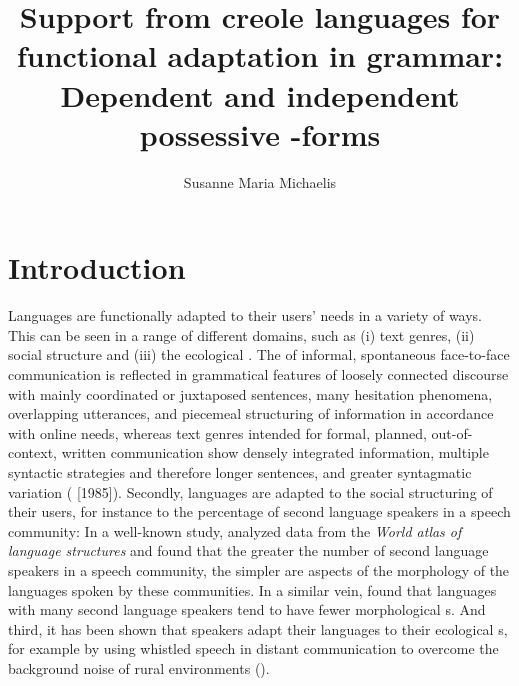\documentclass[output=paper]{langsci/langscibook}
\author{Susanne Maria Michaelis\affiliation{Leipzig University \& Max Planck Institute for the Science of Human History (Jena)}}
\title{Support from creole languages for functional adaptation in grammar: Dependent and independent possessive\is{possessive construction} \isi{person}-forms}
\begin{document}
\maketitle 




\section{Introduction}

Languages are functionally adapted to their users’ needs in a variety of ways. This can be seen in a range of different domains, such as (i) text genres, (ii) social structure and (iii) the ecological . The  of informal, spontaneous face-to-face communication is reflected in grammatical features of loosely connected discourse with mainly coordinated or juxtaposed sentences, many hesitation phenomena, overlapping utterances, and piecemeal structuring of information in accordance with online  needs, whereas text genres intended for formal, planned, out-of-context, written communication show densely integrated information, multiple syntactic  strategies and therefore longer sentences, and greater syntagmatic variation (\citealt{KochOesterreicher2012} [1985]). Secondly, languages are adapted to the social structuring of their users, for instance to the percentage of second language speakers in a speech community: In a well-known study, \citet{LupyanDale2010} analyzed data from the \textit{World atlas of language structures} \citep{HaspelmathEtAl2005} and found that the greater the number of second language speakers in a speech community, the simpler are aspects of the morphology of the languages spoken by these communities. In a similar vein, \citet{BentzWinter2013} found that languages with many second language speakers tend to have fewer morphological s. And third, it has been shown that speakers adapt their languages to their ecological s, for example by using whistled speech in distant communication to overcome the background noise of rural environments (\citealt{Meyer2005,Meyer2008}). 
\end{document}
